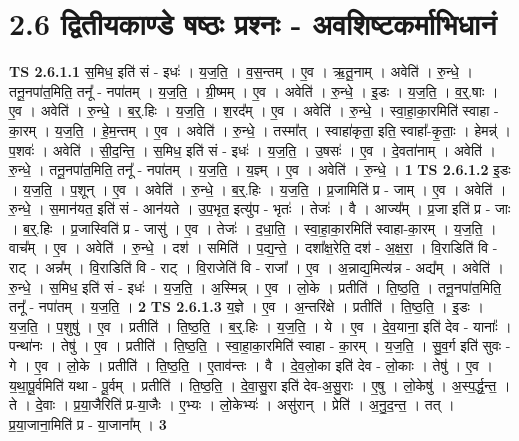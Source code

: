 \documentclass[17pt]{extarticle}
\begin{document}
\section*{ 2.6      द्वितीयकाण्डे षष्ठः प्रश्नः - अवशिष्टकर्माभिधानं }
                                \textbf{ TS 2.6.1.1} \newline
                  स॒मिध॒ इति॑ सं - इधः॑ । य॒ज॒ति॒ । व॒स॒न्तम् । ए॒व । ऋ॒तू॒नाम् । अवेति॑ । रु॒न्धे॒ । तनू॒नपा॑त॒मिति॒ तनू᳚ - नपा॑तम् । य॒ज॒ति॒ । ग्री॒ष्मम् । ए॒व । अवेति॑ । रु॒न्धे॒ । इ॒डः । य॒ज॒ति॒ । व॒र्॒.षाः । ए॒व । अवेति॑ । रु॒न्धे॒ । ब॒र्॒.हिः । य॒ज॒ति॒ । श॒रद᳚म् । ए॒व । अवेति॑ । रु॒न्धे॒ । स्वा॒हा॒का॒रमिति॑ स्वाहा - का॒रम् । य॒ज॒ति॒ । हे॒म॒न्तम् । ए॒व । अवेति॑ । रु॒न्धे॒ । तस्मा᳚त् । स्वाहा॑कृता॒ इति॒ स्वाहा᳚-कृ॒ताः॒ । हेमन्न्॑ । प॒शवः॑ । अवेति॑ । सी॒द॒न्ति॒ । स॒मिध॒ इति॑ सं - इधः॑ । य॒ज॒ति॒ । उ॒षसः॑ । ए॒व । दे॒वता॑नाम् । अवेति॑ । रु॒न्धे॒ । तनू॒नपा॑त॒मिति॒ तनू᳚ - नपा॑तम् । य॒ज॒ति॒ । य॒ज्ञ्म् । ए॒व । अवेति॑ । रु॒न्धे॒ । \textbf{  1} \newline
                  \newline
                                \textbf{ TS 2.6.1.2} \newline
                  इ॒डः । य॒ज॒ति॒ । प॒शून् । ए॒व । अवेति॑ । रु॒न्धे॒ । ब॒र्॒.हिः । य॒ज॒ति॒ । प्र॒जामिति॑ प्र - जाम् । ए॒व । अवेति॑ । रु॒न्धे॒ । स॒मान॑यत॒ इति॑ सं - आन॑यते । उ॒प॒भृत॒ इत्यु॑प - भृतः॑ । तेजः॑ । वै । आज्य᳚म् । प्र॒जा इति॑ प्र - जाः । ब॒र्॒.हिः । प्र॒जास्विति॑ प्र - जासु॑ । ए॒व । तेजः॑ । द॒धा॒ति॒ । स्वा॒हा॒का॒रमिति॑ स्वाहा-का॒रम् । य॒ज॒ति॒ । वाच᳚म् । ए॒व । अवेति॑ । रु॒न्धे॒ । दश॑ । समिति॑ । प॒द्य॒न्ते॒ । दशा᳚क्ष॒रेति॒ दश॑ - अ॒क्ष॒रा॒ । वि॒राडिति॑ वि - राट् । अन्न᳚म् । वि॒राडिति॑ वि - राट् । वि॒राजेति॑ वि - राजा᳚ । ए॒व । अ॒न्नाद्य॒मित्य॑न्न - अद्य᳚म् । अवेति॑ । रु॒न्धे॒ । स॒मिध॒ इति॑ सं - इधः॑ । य॒ज॒ति॒ । अ॒स्मिन्न् । ए॒व । लो॒के । प्रतीति॑ । ति॒ष्ठ॒ति॒ । तनू॒नपा॑त॒मिति॒ तनू᳚ - नपा॑तम् । य॒ज॒ति॒ । \textbf{  2} \newline
                  \newline
                                \textbf{ TS 2.6.1.3} \newline
                  य॒ज्ञे । ए॒व । अ॒न्तरि॑क्षे । प्रतीति॑ । ति॒ष्ठ॒ति॒ । इ॒डः । य॒ज॒ति॒ । प॒शुषु॑ । ए॒व । प्रतीति॑ । ति॒ष्ठ॒ति॒ । ब॒र्॒.हिः । य॒ज॒ति॒ । ये । ए॒व । दे॒व॒याना॒ इति॑ देव - यानाः᳚ । पन्था॑नः । तेषु॑ । ए॒व । प्रतीति॑ । ति॒ष्ठ॒ति॒ । स्वा॒हा॒का॒रमिति॑ स्वाहा - का॒रम् । य॒ज॒ति॒ । सु॒व॒र्ग इति॑ सुवः - गे । ए॒व । लो॒के । प्रतीति॑ । ति॒ष्ठ॒ति॒ । ए॒ताव॑न्तः । वै । दे॒व॒लो॒का इति॑ देव - लो॒काः । तेषु॑ । ए॒व । य॒था॒पू॒र्वमिति॑ यथा - पू॒र्वम् । प्रतीति॑ । ति॒ष्ठ॒ति॒ । दे॒वा॒सु॒रा इति॑ देव-अ॒सु॒राः । ए॒षु । लो॒केषु॑ । अ॒स्प॒र्द्ध॒न्त॒ । ते । दे॒वाः । प्र॒या॒जैरिति॑ प्र-या॒जैः । ए॒भ्यः । लो॒केभ्यः॑ । असु॑रान् । प्रेति॑ । अ॒नु॒द॒न्त॒ । तत् । प्र॒या॒जाना॒मिति॑ प्र - या॒जाना᳚म् । \textbf{  3} \newline
\end{document}
